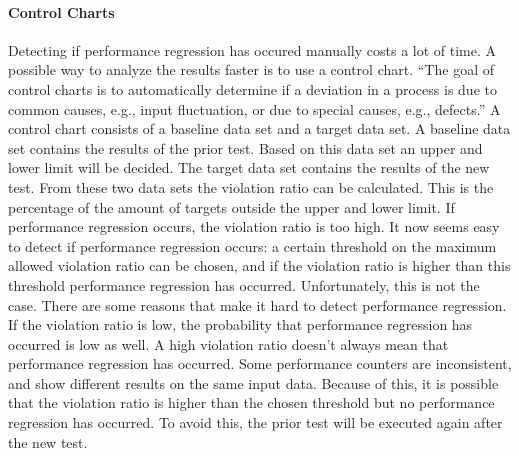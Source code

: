 \paragraph{Control Charts}
Detecting if performance regression has occured manually costs a lot of time. A possible way to analyze the results faster is to use a control chart.
``The goal of control charts is to automatically determine if a deviation in a process is due to common causes, e.g., input fluctuation, or due to special causes, e.g., defects.'' \cite{nguyen2012using} A control chart consists of a baseline data set and a target data set. A baseline data set contains the results of the prior test. Based on this data set an upper and lower limit will be decided. The target data set contains the results of the new test. From these two data sets the violation ratio can be calculated. This is the percentage of the amount of targets outside the upper and lower limit. If performance regression occurs, the violation ratio is too high. It now seems easy to detect if performance regression occurs: a certain threshold on the maximum allowed violation ratio can be chosen, and if the violation ratio is higher than this threshold performance regression has occurred. Unfortunately, this is not the case. There are some reasons that make it hard to detect performance regression. If the violation ratio is low, the probability that performance regression has occurred is low as well. A high violation ratio doesn't always mean that performance regression has occurred. Some performance counters are inconsistent, and show different results on the same input data. Because of this, it is possible that the violation ratio is higher than the chosen threshold but no performance regression has occurred. To avoid this, the prior test will be executed again after the new test.






